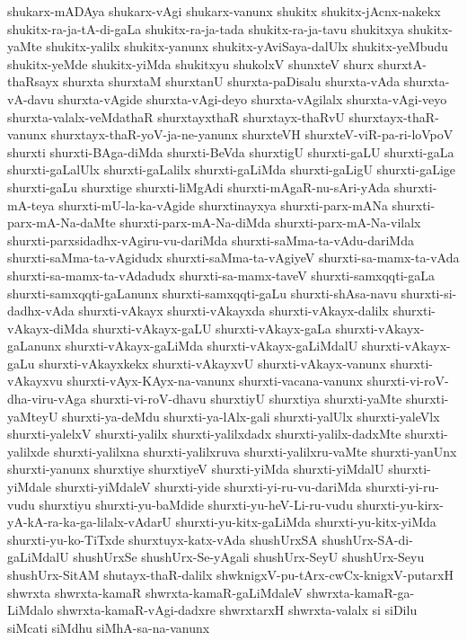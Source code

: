 {shukarx-mADAya
shukarx-vAgi
shukarx-vanunx
shukitx
shukitx-jAcnx-nakekx
shukitx-ra-ja-tA-di-gaLa
shukitx-ra-ja-tada
shukitx-ra-ja-tavu
shukitxya
shukitx-yaMte
shukitx-yalilx
shukitx-yanunx
shukitx-yAviSaya-dalUlx
shukitx-yeMbudu
shukitx-yeMde
shukitx-yiMda
shukitxyu
shukolxV
shunxteV
shurx
shurxtA-thaRsayx
shurxta
shurxtaM
shurxtanU
shurxta-paDisalu
shurxta-vAda
shurxta-vA-davu
shurxta-vAgide
shurxta-vAgi-deyo
shurxta-vAgilalx
shurxta-vAgi-veyo
shurxta-valalx-veMdathaR
shurxtayxthaR
shurxtayx-thaRvU
shurxtayx-thaR-vanunx
shurxtayx-thaR-yoV-ja-ne-yanunx
shurxteVH
shurxteV-viR-pa-ri-loVpoV
shurxti
shurxti-BAga-diMda
shurxti-BeVda
shurxtigU
shurxti-gaLU
shurxti-gaLa
shurxti-gaLalUlx
shurxti-gaLalilx
shurxti-gaLiMda
shurxti-gaLigU
shurxti-gaLige
shurxti-gaLu
shurxtige
shurxti-liMgAdi
shurxti-mAgaR-nu-sAri-yAda
shurxti-mA-teya
shurxti-mU-la-ka-vAgide
shurxtinayxya
shurxti-parx-mANa
shurxti-parx-mA-Na-daMte
shurxti-parx-mA-Na-diMda
shurxti-parx-mA-Na-vilalx
shurxti-parxsidadhx-vAgiru-vu-dariMda
shurxti-saMma-ta-vAdu-dariMda
shurxti-saMma-ta-vAgidudx
shurxti-saMma-ta-vAgiyeV
shurxti-sa-mamx-ta-vAda
shurxti-sa-mamx-ta-vAdadudx
shurxti-sa-mamx-taveV
shurxti-samxqqti-gaLa
shurxti-samxqqti-gaLanunx
shurxti-samxqqti-gaLu
shurxti-shAsa-navu
shurxti-si-dadhx-vAda
shurxti-vAkayx
shurxti-vAkayxda
shurxti-vAkayx-dalilx
shurxti-vAkayx-diMda
shurxti-vAkayx-gaLU
shurxti-vAkayx-gaLa
shurxti-vAkayx-gaLanunx
shurxti-vAkayx-gaLiMda
shurxti-vAkayx-gaLiMdalU
shurxti-vAkayx-gaLu
shurxti-vAkayxkekx
shurxti-vAkayxvU
shurxti-vAkayx-vanunx
shurxti-vAkayxvu
shurxti-vAyx-KAyx-na-vanunx
shurxti-vacana-vanunx
shurxti-vi-roV-dha-viru-vAga
shurxti-vi-roV-dhavu
shurxtiyU
shurxtiya
shurxti-yaMte
shurxti-yaMteyU
shurxti-ya-deMdu
shurxti-ya-lAlx-gali
shurxti-yalUlx
shurxti-yaleVlx
shurxti-yalelxV
shurxti-yalilx
shurxti-yalilxdadx
shurxti-yalilx-dadxMte
shurxti-yalilxde
shurxti-yalilxna
shurxti-yalilxruva
shurxti-yalilxru-vaMte
shurxti-yanUnx
shurxti-yanunx
shurxtiye
shurxtiyeV
shurxti-yiMda
shurxti-yiMdalU
shurxti-yiMdale
shurxti-yiMdaleV
shurxti-yide
shurxti-yi-ru-vu-dariMda
shurxti-yi-ru-vudu
shurxtiyu
shurxti-yu-baMdide
shurxti-yu-heV-Li-ru-vudu
shurxti-yu-kirx-yA-kA-ra-ka-ga-lilalx-vAdarU
shurxti-yu-kitx-gaLiMda
shurxti-yu-kitx-yiMda
shurxti-yu-ko-TiTxde
shurxtuyx-katx-vAda
shushUrxSA
shushUrx-SA-di-gaLiMdalU
shushUrxSe
shushUrx-Se-yAgali
shushUrx-SeyU
shushUrx-Seyu
shushUrx-SitAM
shutayx-thaR-dalilx
shwknigxV-pu-tArx-cwCx-knigxV-putarxH
shwrxta
shwrxta-kamaR
shwrxta-kamaR-gaLiMdaleV
shwrxta-kamaR-ga-LiMdalo
shwrxta-kamaR-vAgi-dadxre
shwrxtarxH
shwrxta-valalx
si
siDilu
siMcati
siMdhu
siMhA-sa-na-vanunx
}
